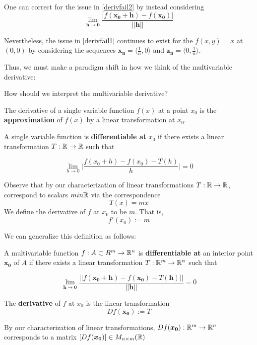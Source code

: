 \begin{remark}
    One can correct for the issue in \ref{derivfail2} by instead considering $$\lim_{\bm{h} \to \bm{0}} \frac{|f(\bm{x_0+h})-f(\bm{x_0})|}{||\bm{h}||}$$

    Nevertheless, the issue in \ref{derivfail1} continues to exist for the $f(x,y) = x$ at $(0,0)$ by considering the sequences $\bm{x_n} = \langle \frac{1}{n}, 0 \rangle$ and $\bm{z_n} = \langle 0, \frac{1}{n}\rangle$.
\end{remark}

Thus, we must make a paradigm shift in how we think of the multivariable derivative:


\begin{motivating}
    How should we interpret the multivariable derivative?
\end{motivating}


    The derivative of a single variable function $f(x)$ at a point $x_0$ is the \textbf{approximation} of $f(x)$ by a linear transformation at $x_0$.

\begin{definition}
    A single variable function is \textbf{differentiable at }$x_0$ if there exists a linear transformation $T: \mathbb{R} \to \mathbb{R}$ such that 
    
    $$\lim_{h \to 0} \bigg|\frac{f(x_0+h)-f(x_0)-T(h)}{h}\bigg| = 0$$
    
    Observe that by our characterization of linear transformations $T: \mathbb{R} \to \mathbb{R}$, correspond to scalars $m in \mathbb{R}$ via the correspondence    
    $$T(x) = mx$$  
    We define the derivative of $f$ at $x_0$ to be $m$. That is,    
    $$f'(x_0) := m$$
    \end{definition}

We can generalize this definition as follows:

\begin{definition}
    A multivariable function $f : A \subset R^m \to \mathbb{R}^n$ is \textbf{differentiable at} an interior point $\bm{x_0}$ of $A$  if there exists a linear transformation $T: \mathbb{R}^m \to \mathbb{R}^n$ such that 
    
    $$\lim_{\bm{h} \to \bm{0}} \frac{||f(\bm{x_0+h})-f(\bm{x_0})-T(\bm{h})||}{||\bm{h}||} = 0$$
    
    The \textbf{derivative} of $f$ at $x_0$ is the linear transformation $$Df(\bm{x_0}) := T$$

    By our characterization of linear transformations, $Df(\bm{x_0}) : \mathbb{R}^m \to \mathbb{R}^n$ corresponds to a matrix $[Df(\bm{x_0})] \in M_{n\times m}(\mathbb{R})$
    \end{definition}

